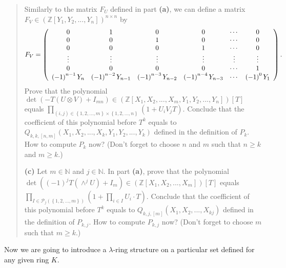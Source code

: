 \documentclass[12pt,final,notitlepage,onecolumn,german]{article}%
\begin{document}
\begin{quotation}
Similarly to the matrix $F_{U}$ defined in part \textbf{(a)}, we can define a
matrix $F_{V}\in\left(  \mathbb{Z}\left[  Y_{1},Y_{2},...,Y_{n}\right]
\right)  ^{n\times n}$ by%
\[
F_{V}=\left(
\begin{array}
[c]{cccccc}%
0 & 1 & 0 & 0 & \cdots & 0\\
0 & 0 & 1 & 0 & \cdots & 0\\
0 & 0 & 0 & 1 & \cdots & 0\\
\vdots & \vdots & \vdots & \vdots & \vdots & \vdots\\
0 & 0 & 0 & 0 & \cdots & 1\\
\left(  -1\right)  ^{n-1}Y_{n} & \left(  -1\right)  ^{n-2}Y_{n-1} & \left(
-1\right)  ^{n-3}Y_{n-2} & \left(  -1\right)  ^{n-4}Y_{n-3} & \cdots & \left(
-1\right)  ^{0}Y_{1}%
\end{array}
\right)  .
\]
Prove that the polynomial $\det\left(  -T\left(  U\otimes V\right)
+I_{mn}\right)  \in\left(  \mathbb{Z}\left[  X_{1},X_{2},...,X_{m},Y_{1}%
,Y_{2},...,Y_{n}\right]  \right)  \left[  T\right]  $ equals $\prod
\limits_{\left(  i,j\right)  \in\left\{  1,2,...,m\right\}  \times\left\{
1,2,...,n\right\}  }\left(  1+U_{i}V_{j}T\right)  .$ Conclude that the
coefficient of this polynomial before $T^{k}$ equals to $Q_{k,k,\left[
n,m\right]  }\left(  X_{1},X_{2},...,X_{k},Y_{1},Y_{2},...,Y_{k}\right)  $
defined in the definition of $P_{k}$. How to compute $P_{k}$ now? (Don't
forget to choose $n$ and $m$ such that $n\geq k$ and $m\geq k$.)

\textbf{(c)} Let $m\in\mathbb{N}$ and $j\in\mathbb{N}$. In part \textbf{(a)},
prove that the polynomial $\det\left(  \left(  -1\right)  ^{j}T\left(
\wedge^{j}U\right)  +I_{m}\right)  \in\left(  \mathbb{Z}\left[  X_{1}%
,X_{2},...,X_{m}\right]  \right)  \left[  T\right]  $ equals $\prod
\limits_{I\in\mathcal{P}_{j}\left(  \left\{  1,2,...,m\right\}  \right)
}\left(  1+\prod\limits_{i\in I}U_{i}\cdot T\right)  $. Conclude that the
coefficient of this polynomial before $T^{k}$ equals to $Q_{k,j,\left[
m\right]  }\left(  X_{1},X_{2},...,X_{kj}\right)  $ defined in the definition
of $P_{k,j}$. How to compute $P_{k,j}$ now? (Don't forget to choose $m$ such
that $m\geq k$.)
\end{quotation}

\begin{center}
\end{center}

Now we are going to introduce a $\lambda$-ring structure on a particular set
defined for any given ring $K.$
\end{document}
